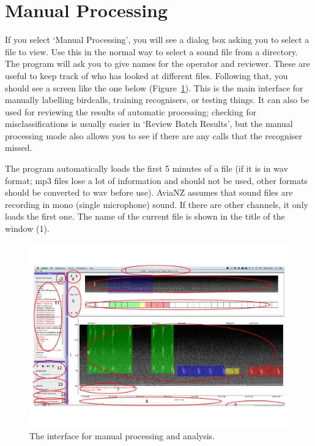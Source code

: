 \documentclass{article}
\begin{document}
\section{Manual Processing}
\label{sec:manual}

If you select `Manual Processing', you will see a dialog box asking you to select a file to view. Use this in the normal way to select a sound file from a directory. The program will ask you to give names for the operator and reviewer. These are useful to keep track of who has looked at different files. Following that, you should see a screen like the one below (Figure~\ref{main}). This is the main interface for manually labelling birdcalls, training recognisers, or testing things. It can also be used for reviewing the results of automatic processing; checking for misclassifications is usually easier in `Review Batch Results', but the manual processing mode also allows you to see if there are any calls that the recogniser missed.

The program automatically loads the first 5 minutes of a file (if it is in wav format; mp3 files lose a lot of information and should not be used, other formats should be converted to wav before use). AviaNZ assumes that sound files are recording in mono (single microphone) sound. If there are other channels, it only loads the first one.
The name of the current file is shown in the title of the window (1).

\begin{figure}[h!]
\centering
\includegraphics[width=.8\textwidth]{Figs/AviaNZInterface.pdf}
\caption{The interface for manual processing and analysis.}
\label{main}
\end{figure}
\end{document}
